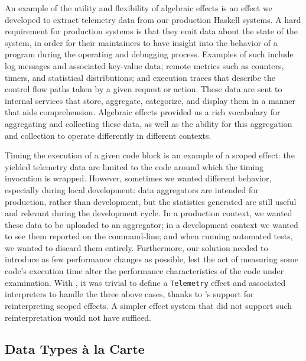 \documentclass[acmsmall,fleqn]{acmart}
\begin{document}
An example of the utility and flexibility of algebraic effects is an effect we
developed to extract telemetry data from our production Haskell systems. A
hard requirement for production systems is that they emit data about the state
of the system, in order for their maintainers to have insight into the
behavior of a program during the operating and debugging process. Examples of
such include log messages and associated key-value data; remote metrics such
as counters, timers, and statistical distributions; and execution traces that
describe the control flow paths taken by a given request or action. These data
are sent to internal services that store, aggregate, categorize, and display
them in a manner that aids comprehension. Algebraic effects provided us a rich
vocabulary for aggregating and collecting these data, as well as the ability
for this aggregation and collection to operate differently in different
contexts.

Timing the execution of a given code block is an example of a scoped effect: the
yielded telemetry data are limited to the code around which the timing invocation
is wrapped. However, sometimes we wanted different behavior, especially during
local development: data aggregators are intended for production, rather than
development, but the statistics generated are still useful and relevant during
the development cycle. In a production context, we wanted these data to be
uploaded to an aggregator; in a development context we wanted to see them
reported on the command-line; and when running automated tests, we wanted to
discard them entirely. Furthermore, our solution needed to introduce as few
performance changes as possible, lest the act of measuring some code's execution
time alter the performance characteristics of the code under examination. With
\fe{}, it was trivial to define a \texttt{Telemetry} effect and associated
interpreters to handle the three above cases, thanks to \fe{}'s support for
reinterpreting scoped effects. A simpler effect system that did not support
such reinterpretation would not have sufficed.

\subsection{Data Types à la Carte} \label{sec:dtalc}
\end{document}
